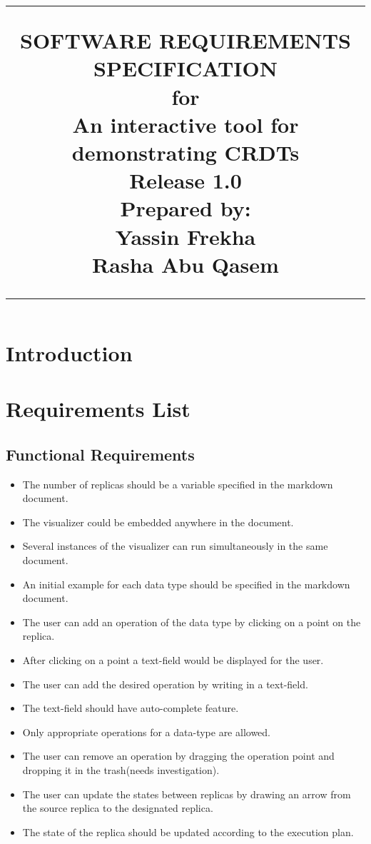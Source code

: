 \documentclass{scrreprt}
\title{%
	\flushleft
	\rule{16cm}{5pt}\vskip1cm
	\Huge{SOFTWARE REQUIREMENTS\\ SPECIFICATION}\\
	\vspace{2cm}
	for\\
	\vspace{2cm}
	An interactive tool for demonstrating CRDTs\\
	\vspace{2cm}
	\LARGE{Release 1.0\\}
	\vspace{2cm}
	Prepared by:\\
	Yassin Frekha \\
   	Rasha Abu Qasem\\
	\vfill
	\rule{16cm}{5pt}
}
\date{}
\begin{document}
	\maketitle
	\tableofcontents
	\chapter{Introduction}
	
	\chapter{Requirements List}
	\section{Functional Requirements}
	\begin{itemize}
	\item The number of replicas should be a variable specified in the markdown document.
	\item The visualizer could be embedded anywhere in the document.
	\item Several instances of the visualizer can run simultaneously in the same document. 
	\item An initial example for each data type should be specified in the markdown document.
	\item The user can add an operation of the data type by clicking on a point on the replica.
	\item After clicking on a point a text-field would be displayed for the user.
	\item The user can add the desired operation by writing in a text-field.
	\item The text-field should have auto-complete feature.
	\item Only appropriate operations for a data-type are allowed.  
	\item The user can remove an operation by dragging the operation point and dropping it in the trash(needs investigation). 
	\item The user can update the states between replicas by drawing an arrow from the source replica to the designated replica.
	\item The state of the replica should be updated according to the execution plan.
	
	\end{itemize}
\end{document}
